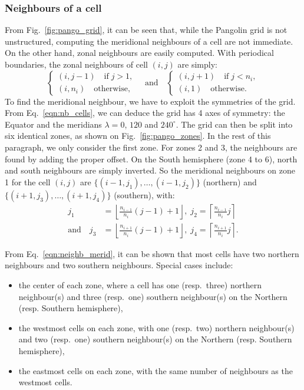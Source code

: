 \subsubsection{Neighbours of a cell}
From Fig.~\ref{fig:pango_grid}, it can be seen that, while the Pangolin grid is not
unstructured, computing the meridional neighbours of a cell are not immediate.
On the other hand, zonal neighbours are easily computed. With periodical
boundaries, the zonal neighbours of cell $(i,j)$ are simply:
\begin{equation}
  \begin{cases}
    (i,j-1) \quad \text{if} \; j > 1, \\
    (i, n_i)  \quad \text{otherwise,}
  \end{cases}
  \quad \text{and} \quad
  \begin{cases}
    (i,j+1) \quad \text{if} \; j < n_i, \\
    (i,1)  \quad \text{otherwise.}
  \end{cases}
\end{equation}
To find the meridional neighbour, we have to exploit the symmetries of the grid.
From Eq.~\eqref{eqn:nb_cells}, we can deduce the grid has 4 axes of symmetry:
the Equator and the meridians $\lambda=0$, $120$ and $240^\circ$. The grid can
then be split into six identical zones, as shown on Fig.~\ref{fig:pango_zones}.
In the rest of this paragraph, we only consider the first zone.  For zones 2 and
3, the neighbours are found by adding the proper offset. On the South hemisphere
(zone 4 to 6), north and south neighbours are simply inverted. So the meridional
neighbours on zone 1 for the cell $(i,j)$ are
$\big\{(i-1,j_1), \ldots, (i-1, j_2)\big\}$ (northern) and 
$\big\{(i+1,j_3), \ldots, (i+1, j_4)\big\}$ (southern), with:
\begin{equation}
  \begin{aligned}
    j_1 &= \left\lfloor \frac{n_{i-1}}{n_i}(j-1)+1\right\rfloor, \;
    j_2 = \left\lceil \frac{n_{i-1}}{n_i}j\right\rceil \\
    \text{and} \quad 
    j_3 &= \left\lfloor \frac{n_{i+1}}{n_i}(j-1)+1\right\rfloor, \;
    j_4 = \left\lceil \frac{n_{i+1}}{n_i}j\right\rceil.
    \label{eqn:neighb_merid}
  \end{aligned}
\end{equation}

From Eq.~\eqref{eqn:neighb_merid}, it can be shown that most cells have two
northern neighbours and two southern neighbours. Special cases include:
\begin{itemize}
  \item the center of each zone, where a cell has one (resp.~three) northern
    neighbour(s) and three (resp.~one) southern neighbour(s) on the Northern (resp. Southern
    hemisphere),
  \item the westmost cells on each zone, with one (resp.~two) northern neighbour(s)
    and two (resp.~one) southern neighbour(s) on the Northern (resp. Southern
    hemisphere),
  \item the eastmost cells on each zone, with the same number of neighbours as
    the westmost cells.
\end{itemize}

